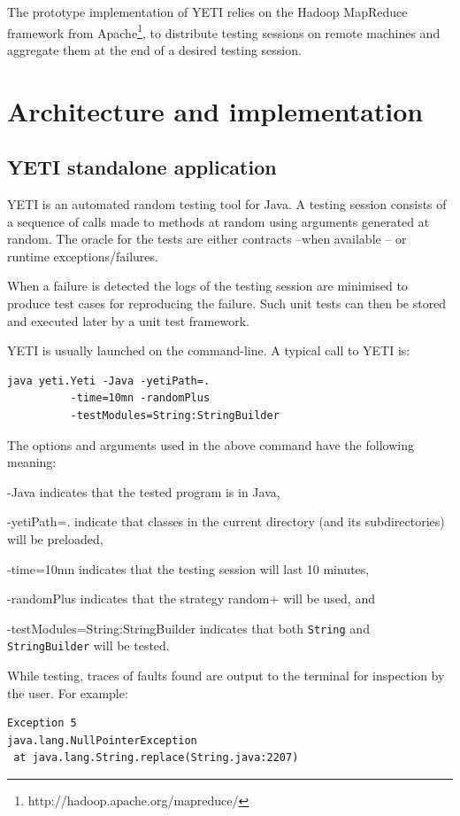 \documentclass [a4paper, 11pt, twoside] {report}
\begin{document}
The prototype implementation of YETI relies on the Hadoop MapReduce framework from Apache\footnote{http://hadoop.apache.org/mapreduce/}, to distribute testing sessions on remote machines and aggregate them at the end of a desired testing session.

\section{Architecture and implementation}\label{sec:architecture}

\subsection{YETI standalone application}
YETI is an automated random testing tool for Java. A testing session consists of a sequence of calls made to methods at random using arguments generated at random.  The oracle for the tests are either contracts --when available -- or runtime exceptions/failures.

When a failure is detected the logs of the testing session are minimised to 
produce test cases for reproducing the failure. Such unit tests can then be stored and 
executed later by a unit test framework.

YETI is usually launched on the command-line. A typical call to YETI is:
{\small
\begin{verbatim}
java yeti.Yeti -Java -yetiPath=. 
          -time=10mn -randomPlus
          -testModules=String:StringBuilder 
\end{verbatim}
}

The options and arguments used in the above command have the following meaning:
\begin{description}
\item{-Java} indicates that the tested program is in Java, 
\item{-yetiPath=.} indicate that classes in the current directory (and its subdirectories) will be preloaded, 
\item{-time=10mn} indicates that the testing session will last 10 minutes, 
\item{-randomPlus} indicates that the strategy random+ will be used, and 
\item{-testModules=String:StringBuilder} indicates that 
both \texttt{String} and \texttt{StringBuilder} will be tested.
\end{description}

While testing, traces of faults found are output to the terminal for inspection by the user. For example:
{\small
\begin{verbatim}
Exception 5
java.lang.NullPointerException
 at java.lang.String.replace(String.java:2207)
\end{verbatim}
}
\end{document}
